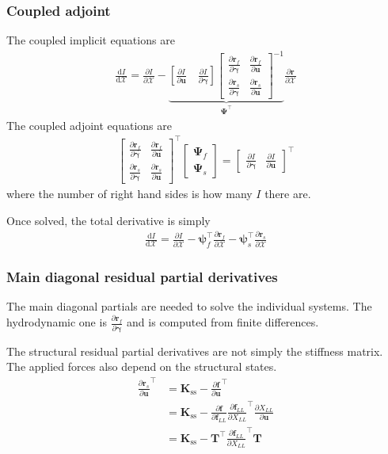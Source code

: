 \documentclass[10pt]{article}
\newcommand{\pp}[2]{\frac{\partial #1}{\partial #2}}
\newcommand{\dd}[2]{\frac{\textrm{d} #1}{\textrm{d} #2}}
\newcommand{\mb}[1]{\boldsymbol{\mathbf{#1}}} %
\newcommand{\mbf}[1]{\mathbf{#1}}
\newcommand{\mbs}[1]{\boldsymbol{#1}}
\newcommand{\mcal}[1]{\mathcal{#1}} %
\newcommand{\beq}{\begin{equation}\begin{aligned}}
\newcommand{\eeq}{\end{aligned}\end{equation}}
\newcommand{\tn}[1]{\textrm{#1}}
\begin{document}
\subsubsection{Coupled adjoint}


The coupled implicit equations are
\beq
\dd{I}{\mcal{X}} =
\pp{I}{\mcal{X}}
-
\underbrace{
\left[\pp{I}{\mbf{u}} \quad \pp{I}{\mbs{\gamma}} \right]
\begin{bmatrix}
	\pp{\mbf{r}_f}{\mb{\gamma}} & \pp{\mbf{r}_f}{\mb{u}}
	\\
	\pp{\mbf{r}_s}{\mb{\gamma}} & \pp{\mbf{r}_s}{\mb{u}}
\end{bmatrix}
^{-1}
}_{\boldsymbol{\Psi^\top}}
\pp{\mbf{r}}{\mcal{X}}
\eeq
The coupled adjoint equations are
\beq
\begin{bmatrix}
	\pp{\mb{r}_f}{\mb{\gamma}} & \pp{\mb{r}_f}{\mb{u}}
	\\
	\pp{\mb{r}_s}{\mb{\gamma}} & \pp{\mb{r}_s}{\mb{u}}
\end{bmatrix}^\top
\begin{bmatrix}
	\mb{\Psi}_f \\
	\mb{\Psi}_s
\end{bmatrix}
=
\begin{bmatrix}
	\pp{I}{\mb{\gamma}} & \pp{I}{\mb{u}}
\end{bmatrix}^\top
\eeq
where the number of right hand sides is how many $I$ there are.

Once solved, the total derivative is simply
\beq
\dd{I}{\mcal{X}} = \pp{I}{\mcal{X}} - \mb{\psi}_f^\top \pp{\mb{r}_f}{\mcal{X}} - \mb{\psi}_s^\top \pp{\mb{r}_s}{\mcal{X}}
\eeq

\subsubsection{Main diagonal residual partial derivatives}

The main diagonal partials are needed to solve the individual systems.
The hydrodynamic one is $\pp{\mb{r}_f}{\mb{\gamma}}$ and is computed from finite differences.

The structural residual partial derivatives are not simply the stiffness matrix.
The applied forces also depend on the structural states.
\beq
\pp{\mb{r}_s}{\mb{u}}^\top &= 
\mb{K}_\tn{ss} - \pp{\mb{f}}{\mb{u}}^\top
\\
&=\mb{K}_\tn{ss} - \pp{\mb{f}}{\mb{f}_{LL}}\pp{\mb{f}_{LL}}{X_{LL}}^\top
\pp{X_{LL}}{\mb{u}}
\\
&=\mb{K}_\tn{ss} - \mb{T}^\top\pp{\mb{f}_{LL}}{X_{LL}}^\top\mb{T}
\eeq
\end{document}
